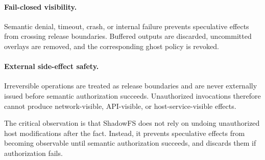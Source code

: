 \paragraph{Fail-closed visibility.}
Semantic denial, timeout, crash, or internal failure prevents speculative
effects from crossing release boundaries. Buffered outputs are discarded,
uncommitted overlays are removed, and the corresponding ghost policy is
revoked.

\paragraph{External side-effect safety.}
Irreversible operations are treated as release boundaries and are never
externally issued before semantic authorization succeeds. Unauthorized
invocations therefore cannot produce network-visible, API-visible, or
host-service-visible effects.

The critical observation is that ShadowFS does not rely on undoing
unauthorized host modifications after the fact. Instead, it prevents
speculative effects from becoming observable until semantic authorization
succeeds, and discards them if authorization fails.
